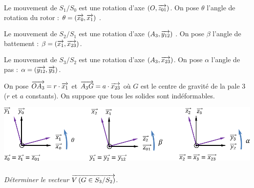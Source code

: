 \documentclass[11pt,oneside]{article}
\begin{document}
{Le mouvement de $S_1/S_0$ est une rotation d'axe $(O,\overrightarrow{z_{01}})$. On pose $\theta$ l’angle de rotation du rotor : $\theta = (\overrightarrow{x_0},\overrightarrow{x_1})$ .

Le mouvement de $S_2/S_1$ est une rotation d'axe $(A_3,\overrightarrow{y_{12}})$ . On pose $\beta$ l’angle de battement : $\beta = (\overrightarrow{x_1},\overrightarrow{x_{23}})$.

Le mouvement de $S_3/S_2$ est une rotation d'axe $(A_3,\overrightarrow{x_{23}})$. On pose $\alpha$ l’angle de pas : $\alpha = (\overrightarrow{y_{12}},\overrightarrow{y_3})$.

On pose $\overrightarrow{OA_3} = r\cdot \overrightarrow{x_1}$ et $\overrightarrow{A_3G}=a\cdot \overrightarrow{x_{23}}$ où $G$ est le centre de gravité de la pale 3 ($r$ et $a$ constants). On suppose que tous les solides sont indéformables.
}

\begin{center}
\includegraphics[width=.9\textwidth]{png/cor1}
\end{center}


\subparagraph{}
\textit{Déterminer le vecteur $\overrightarrow{V\left( {G} \in {S_3}/{S_2}\right)}$.}
\end{document}
